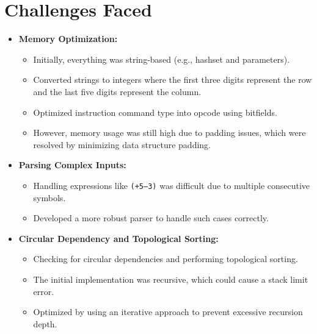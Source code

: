 \documentclass{article}
\begin{document}
\section{Challenges Faced}
 \begin{itemize}
        \item \textbf{Memory Optimization:}
        \begin{itemize}
            \item Initially, everything was string-based (e.g., hashset and parameters).
            \item Converted strings to integers where the first three digits represent the row and the last five digits represent the column.
            \item Optimized instruction command type into opcode using bitfields.
            \item However, memory usage was still high due to padding issues, which were resolved by minimizing data structure padding.
        \end{itemize}
        
        \item \textbf{Parsing Complex Inputs:}
        \begin{itemize}
            \item Handling expressions like \texttt{(+5--3)} was difficult due to multiple consecutive symbols.
            \item Developed a more robust parser to handle such cases correctly.
        \end{itemize}
        
        \item \textbf{Circular Dependency and Topological Sorting:}
        \begin{itemize}
            \item Checking for circular dependencies and performing topological sorting.
            \item The initial implementation was recursive, which could cause a stack limit error.
            \item Optimized by using an iterative approach to prevent excessive recursion depth.
        \end{itemize}
    \end{itemize}
\end{document}
